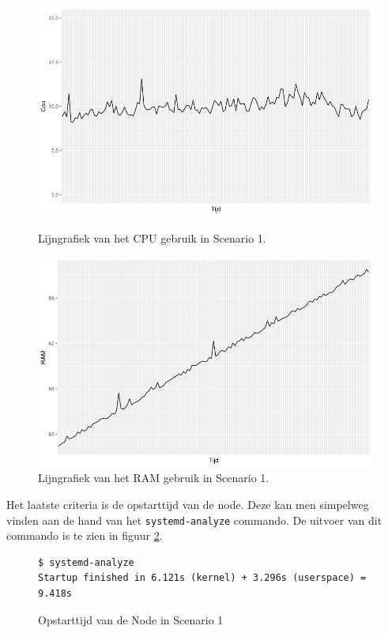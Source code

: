 \begin{figure}[h]
	\centering
	\begin{minipage}[b]{0.45\linewidth}
			\includegraphics[width=\linewidth]{img/SC1_CPUGraph.png}
		\caption{Lijngrafiek van het CPU gebruik in Scenario 1.}
		\label{fig:SC1_CPUGraph}
	\end{minipage}
	\quad
	\begin{minipage}[b]{0.45\linewidth}
		\includegraphics[width=\linewidth]{img/SC1_RAMGraph.png}
		\caption{Lijngrafiek van het RAM gebruik in Scenario 1.}
		\label{fig:SC1_RAMGraph}
	\end{minipage}
\end{figure}


Het laatste criteria is de opstarttijd van de node. Deze kan men simpelweg vinden aan de hand van het \verb|systemd-analyze| commando. De uitvoer van dit commando is te zien in figuur \ref{SC1_StartTime}.

\begin{figure}[h]
	\centering
	\begin{verbatim} 
$ systemd-analyze
Startup finished in 6.121s (kernel) + 3.296s (userspace) = 9.418s
	\end{verbatim}
	\caption{Opstarttijd van de Node in Scenario 1}
	\label{SC1_StartTime}
\end{figure}

